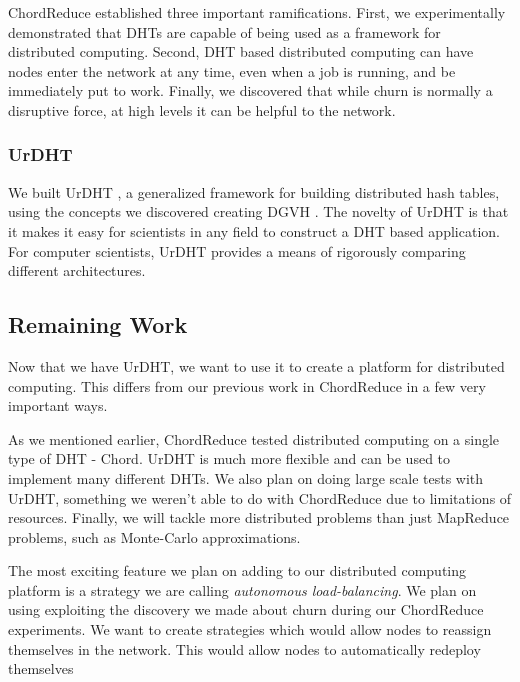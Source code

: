 \documentclass[12pt,a4paper]{article}
\begin{document}
ChordReduce established three important ramifications.
First, we experimentally demonstrated that DHTs are capable of being used as a framework for distributed computing.
Second, DHT based distributed computing can have nodes enter the network at any time, even when a job is running, and be immediately put to work.
Finally, we discovered that while churn is normally a disruptive force, at high levels it can be helpful to the network.

%


\subsubsection*{UrDHT}


We built UrDHT \cite{urdht}, a generalized framework for building distributed hash tables, using the concepts we discovered creating DGVH \cite{dgvh}.
The novelty of UrDHT is that it makes it easy for scientists in any field to construct a DHT based application.
For computer scientists, UrDHT provides a means of rigorously comparing different architectures.

\subsection*{Remaining Work}
Now that we have UrDHT, we want to use it to create a platform for distributed computing.
This differs from our previous work in ChordReduce in a few very important ways.

As we mentioned earlier, ChordReduce tested distributed computing on a single type of DHT - Chord.
UrDHT is much more flexible and can be used to implement many different DHTs.
We also plan on doing large scale tests with UrDHT, something we weren't able to do with ChordReduce due to limitations of resources.
Finally, we will tackle more distributed problems than just MapReduce problems, such as Monte-Carlo approximations.


The most exciting feature we plan on adding to our distributed computing platform is a strategy we are calling \textit{autonomous load-balancing}.
We plan on using exploiting the discovery we made about churn during our ChordReduce experiments.
We want to create strategies which would allow nodes to reassign themselves in the network.
This would allow nodes to automatically redeploy themselves 
\end{document}
